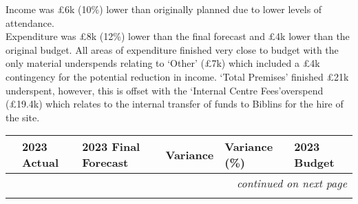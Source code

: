 Income was \pounds6k (10\%) lower than originally planned due to lower levels of attendance.\\

Expenditure was \pounds8k (12\%) lower than the final forecast and \pounds4k lower than the original budget. All areas of expenditure finished very close to budget with the only material underspends relating to `Other' (\pounds7k) which included a \pounds4k contingency for the potential reduction in income. `Total Premises' finished \pounds21k underspent, however, this is offset with the `Internal Centre Fees'overspend (\pounds19.4k) which relates to the internal transfer of funds to Biblins for the hire of the site.

{\RaggedRight \centering
    \begin{longtable}{p{} p{} p{} p{} p{} p{}}
    \textbf{} & \textbf{2023 Actual} & \textbf{2023 Final Forecast} & \textbf{Variance} & \textbf{Variance (\%)} & \textbf{2023 Budget}\\
    \hline
    \hline
    \endhead

    \multicolumn{6}{r}{\footnotesize\itshape continued on next page}\\
    \endfoot 

    \endlastfoot


\end{longtable}}

